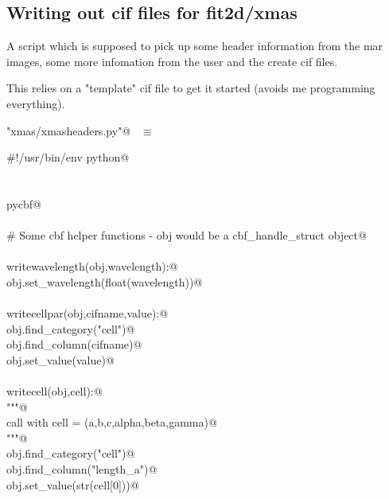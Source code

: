 \documentclass[10pt,a4paper,twoside,notitlepage]{article}
\begin{document}
\subsection{Writing out cif files for fit2d/xmas}

A script which is supposed to pick up some header information from the mar images, 
some more infomation from the user and the create cif files.

This relies on a "template" cif file to get it started (avoids me programming everything).

\begin{flushleft} \small \label{scrap21}
\verb@"xmas/xmasheaders.py"@\nobreak\ {\footnotesize {} }$\equiv$
\vspace{-1ex}
\begin{list}{}{} \item
\mbox{}\verb@#!/usr/bin/env python@\\
\mbox{}\verb@@\\
\mbox{}\verb@@\\
\mbox{}\verb@import pycbf@\\
\mbox{}\verb@@\\
\mbox{}\verb@# Some cbf helper functions - obj would be a cbf_handle_struct object@\\
\mbox{}\verb@@\\
\mbox{}\verb@def writewavelength(obj,wavelength):@\\
\mbox{}\verb@    obj.set_wavelength(float(wavelength))@\\
\mbox{}\verb@@\\
\mbox{}\verb@def writecellpar(obj,cifname,value):@\\
\mbox{}\verb@    obj.find_category("cell")@\\
\mbox{}\verb@    obj.find_column(cifname)@\\
\mbox{}\verb@    obj.set_value(value)@\\
\mbox{}\verb@@\\
\mbox{}\verb@def writecell(obj,cell):@\\
\mbox{}\verb@    """@\\
\mbox{}\verb@    call with cell = (a,b,c,alpha,beta,gamma)@\\
\mbox{}\verb@    """@\\
\mbox{}\verb@    obj.find_category("cell")@\\
\mbox{}\verb@    obj.find_column("length_a")@\\
\mbox{}\verb@    obj.set_value(str(cell[0]))@\\

\end{list}
\end{flushleft}
\end{document}
